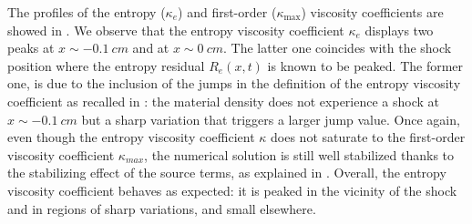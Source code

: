\documentclass[times,doublespace]{fldauth}%
\begin{document}
The profiles of the entropy ($\kappa_e$) and first-order ($\kappa_\text{max}$) viscosity coefficients are showed in . We observe that the entropy viscosity coefficient $\kappa_e$ displays two peaks at $x\sim-0.1 \ cm$ and at $x \sim 0 \ cm$. The latter one coincides with the shock position where the entropy residual $R_e(x,t)$ is known to be peaked. %
The former one, is due to the inclusion of the jumps in the definition of the entropy viscosity coefficient as recalled in : the material density does not experience a shock at $x\sim-0.1 \ cm$ but a sharp variation that triggers a larger jump value. 
Once again, even though the entropy viscosity coefficient $\kappa$ does not saturate to the first-order viscosity coefficient $\kappa_{max}$, the numerical solution is still well stabilized thanks to the stabilizing effect of the source terms, as explained in .
Overall, the entropy viscosity coefficient behaves as expected: it is peaked in the vicinity of the shock and in regions of sharp variations, and small elsewhere.
%
\end{document}

